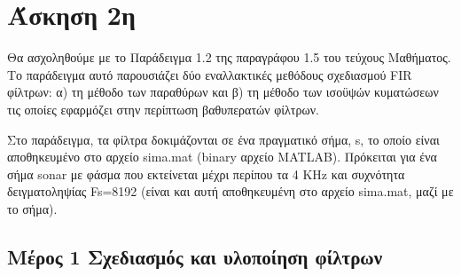 \documentclass[letterpaper,10pt,english]{sphinxmanual}
\begin{document}
\begin{sphinxVerbatim}[commandchars=\\\{\}]
  
  

   
 
 
\end{sphinxVerbatim}

\noindent{}

\noindent{}


\section*{Άσκηση 2η}
\label{\detokenize{Exercise2_0:id1}}\label{\detokenize{Exercise2_0::doc}}
\sphinxAtStartPar
Θα ασχοληθούμε με το Παράδειγμα 1.2 της παραγράφου 1.5 του τεύχους Μαθήματος. Το παράδειγμα αυτό παρουσιάζει δύο εναλλακτικές μεθόδους σχεδιασμού FIR φίλτρων: α) τη μέθοδο των παραθύρων και β) τη μέθοδο των ισοϋψών κυματώσεων τις οποίες εφαρμόζει στην περίπτωση βαθυπερατών φίλτρων.

\sphinxAtStartPar
Στο παράδειγμα, τα φίλτρα δοκιμάζονται σε ένα πραγματικό σήμα, s, το οποίο είναι αποθηκευμένο στο αρχείο sima.mat (binary αρχείο MATLAB). Πρόκειται για ένα σήμα sonar με φάσμα που εκτείνεται μέχρι περίπου τα 4 KHz και συχνότητα δειγματοληψίας Fs=8192 (είναι και αυτή αποθηκευμένη στο αρχείο sima.mat, μαζί με το σήμα).


\subsection*{Μέρος 1 Σχεδιασμός και υλοποίηση φίλτρων}
\label{\detokenize{Exercise2_1:id1}}\label{\detokenize{Exercise2_1::doc}}
\end{document}

